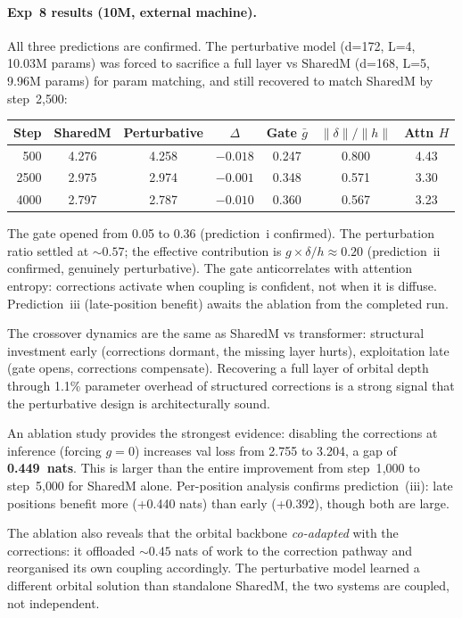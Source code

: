 \documentclass[11pt, a4paper]{article}
\theoremstyle{remark}
\begin{document}
\paragraph{Exp~8 results (10M, external machine).}
All three predictions are confirmed.
The perturbative model (d=172, L=4, 10.03M params) was forced to sacrifice a full layer vs SharedM (d=168, L=5, 9.96M params) for param matching, and still recovered to match SharedM by step~2{,}500:

\begin{center}\small
\begin{tabular}{@{}rcccccc@{}}
\toprule
Step & SharedM & Perturbative & $\Delta$ & Gate $\bar{g}$ & $\|\delta\|/\|h\|$ & Attn $H$ \\
\midrule
500 & 4.276 & 4.258 & $-0.018$ & 0.247 & 0.800 & 4.43 \\
2500 & 2.975 & 2.974 & $-0.001$ & 0.348 & 0.571 & 3.30 \\
4000 & 2.797 & 2.787 & $-0.010$ & 0.360 & 0.567 & 3.23 \\
\bottomrule
\end{tabular}
\end{center}

\noindent The gate opened from 0.05 to 0.36 (prediction~i confirmed).
The perturbation ratio settled at ${\sim}0.57$; the effective contribution is $g \times \delta/h \approx 0.20$ (prediction~ii confirmed, genuinely perturbative).
The gate anticorrelates with attention entropy: corrections activate when coupling is confident, not when it is diffuse.
Prediction~iii (late-position benefit) awaits the ablation from the completed run.

The crossover dynamics are the same as SharedM vs transformer: structural investment early (corrections dormant, the missing layer hurts), exploitation late (gate opens, corrections compensate).
Recovering a full layer of orbital depth through 1.1\% parameter overhead of structured corrections is a strong signal that the perturbative design is architecturally sound.

An ablation study provides the strongest evidence: disabling the corrections at inference (forcing $g{=}0$) increases val loss from 2.755 to 3.204, a gap of \textbf{0.449~nats}.
This is larger than the entire improvement from step~1{,}000 to step~5{,}000 for SharedM alone.
Per-position analysis confirms prediction~(iii): late positions benefit more (+0.440 nats) than early (+0.392), though both are large.

The ablation also reveals that the orbital backbone \emph{co-adapted} with the corrections: it offloaded ${\sim}0.45$ nats of work to the correction pathway and reorganised its own coupling accordingly.
The perturbative model learned a different orbital solution than standalone SharedM, the two systems are coupled, not independent.
\end{document}
